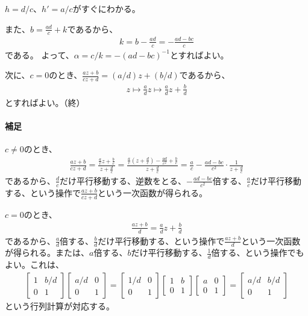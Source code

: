$h=d/c$、$h'=a/c$がすぐにわかる。

また、$b=\frac{ad}{c}+k$であるから、
\begin{align*}
    k=b-\frac{ad}{c}=-\frac{ad-bc}{c}
\end{align*}
である。
よって、$\alpha=c/k=-(ad-bc)^{-1}$とすればよい。

次に、$c=0$のとき、$\frac{az+b}{cz+d}=(a/d)z+(b/d)$であるから、
\begin{align*}
    z\mapsto \frac{a}{d}z\mapsto \frac{a}{d}z+\frac{b}{d}
\end{align*}
とすればよい。（終）
\paragraph{補足}
$c\neq0$のとき、
\begin{align*}
    \frac{az+b}{cz+d}
    =\frac{\frac{a}{c}z+\frac{b}{c}}{z+\frac{d}{c}}
    =\frac{\frac{a}{c}\left(z+\frac{d}{c}\right)-\frac{ad}{c^2}+\frac{b}{c}}{z+\frac{d}{c}}
    =\frac{a}{c}-\frac{ad-bc}{c^2}\cdot\frac{1}{z+\frac{d}{c}}
\end{align*}
であるから、$\frac{d}{c}$だけ平行移動する、逆数をとる、$-\frac{ad-bc}{c^2}$倍する、$\frac{a}{c}$だけ平行移動する、という操作で$\frac{az+b}{cz+d}$という一次函数が得られる。

$c=0$のとき、
\begin{align*}
    \frac{az+b}{d}
    =\frac{a}{d}z+\frac{b}{d}
\end{align*}
であるから、$\frac{a}{d}$倍する、$\frac{b}{d}$だけ平行移動する、という操作で$\frac{az+b}{d}$という一次函数が得られる。または、$a$倍する、$b$だけ平行移動する、$\frac{1}{d}$倍する、という操作でもよい。これは、
\begin{align*}
    \begin{bmatrix}
        1&b/d\\0&1
    \end{bmatrix}
    \begin{bmatrix}
        a/d&0\\0&1
    \end{bmatrix}
    =
    \begin{bmatrix}
        1/d&0\\0&1
    \end{bmatrix}
    \begin{bmatrix}
        1&b\\0&1
    \end{bmatrix}
    \begin{bmatrix}
        a&0\\0&1
    \end{bmatrix}
    =
    \begin{bmatrix}
        a/d&b/d\\0&1
    \end{bmatrix}
\end{align*}
という行列計算が対応する。


